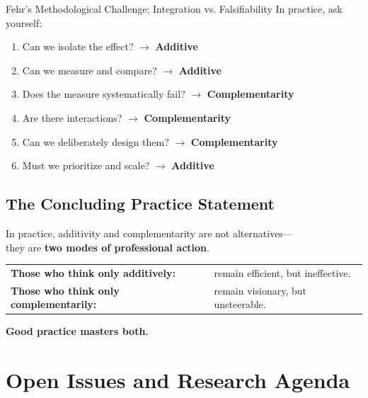 \begin{chapter}{Fehr's Methodological Challenge: Integration vs. Falsifiability}
In practice, ask yourself:

\begin{enumerate}[noitemsep]
    \item Can we isolate the effect? $\rightarrow$ \textbf{Additive}
    \item Can we measure and compare? $\rightarrow$ \textbf{Additive}
    \item Does the measure systematically fail? $\rightarrow$ \textbf{Complementarity}
    \item Are there interactions? $\rightarrow$ \textbf{Complementarity}
    \item Can we deliberately design them? $\rightarrow$ \textbf{Complementarity}
    \item Must we prioritize and scale? $\rightarrow$ \textbf{Additive}
\end{enumerate}

\subsection{The Concluding Practice Statement}

\begin{tcolorbox}[colback=blue!10!white,colframe=blue!75!black,title=\textbf{The Practice Conclusion}]
In practice, additivity and complementarity are not alternatives---\\
they are \textbf{two modes of professional action}.

\medskip
\begin{tabular}{ll}
\textbf{Those who think only additively:} & remain efficient, but ineffective. \\
\textbf{Those who think only complementarily:} & remain visionary, but unsteerable. \\
\end{tabular}

\medskip
\begin{center}
\large
\textbf{Good practice masters both.}
\end{center}
\end{tcolorbox}


\section{Open Issues and Research Agenda}
\label{sec:open-issues}


\end{chapter}
